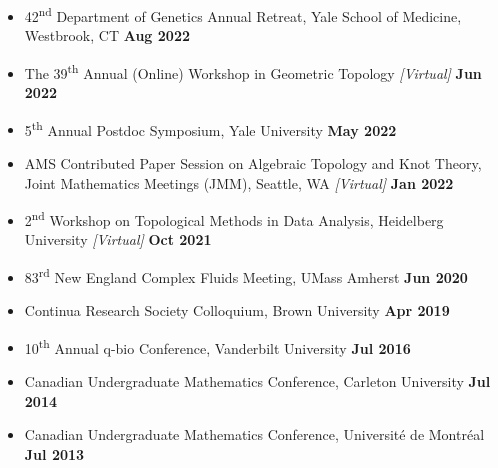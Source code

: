 \documentclass[margin,line]{res}
\begin{document}
\begin{resume}
{\begin{itemize}
\item[] 42\textsuperscript{nd} Department of Genetics Annual Retreat, Yale School of Medicine, Westbrook, CT \hfill {\bf Aug 2022}
\item[] The 39\textsuperscript{th} Annual (Online) Workshop in Geometric Topology \textit{[Virtual]} \hfill {\bf Jun 2022}
\item[] 5\textsuperscript{th} Annual Postdoc Symposium, Yale University \hfill {\bf May 2022}
\item[] AMS Contributed Paper Session on Algebraic Topology and Knot Theory, \\Joint Mathematics Meetings (JMM), Seattle, WA \textit{[Virtual]} \hfill {\bf Jan 2022} 
\item[] 2\textsuperscript{nd} Workshop on Topological Methods in Data Analysis, Heidelberg University \textit{[Virtual]} \hfill {\bf Oct 2021}
\item[] 83\textsuperscript{rd} New England Complex Fluids Meeting, UMass Amherst \hfill {\bf Jun 2020}
\item[] Continua Research Society Colloquium, Brown University \hfill {\bf Apr 2019}
\item[] 10\textsuperscript{th} Annual q-bio Conference, Vanderbilt University \hfill {\bf Jul 2016}
\item[] Canadian Undergraduate Mathematics Conference, Carleton University \hfill {\bf Jul 2014}
\item[] Canadian Undergraduate Mathematics Conference, Universit\'e de Montr\'eal \hfill {\bf Jul 2013}


\end{itemize}}
\end{resume}
\end{document}
